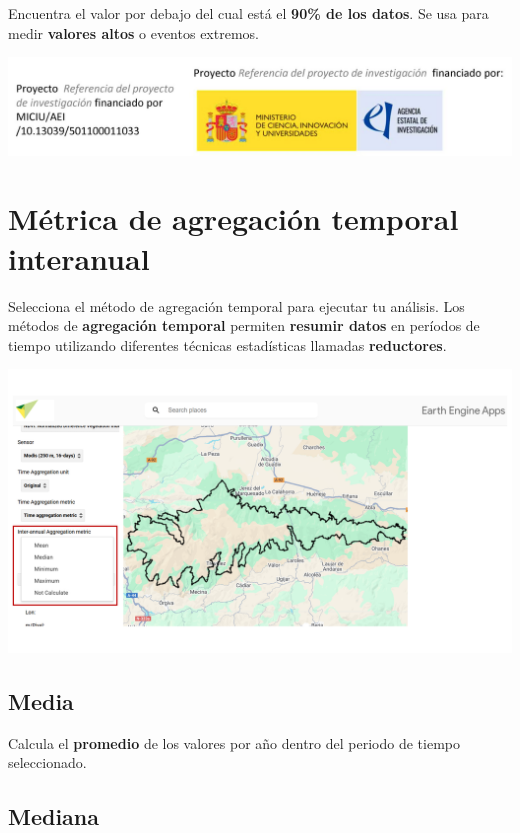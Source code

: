 \documentclass[
]{book}
\begin{document}
Encuentra el valor por debajo del cual está el \textbf{90\% de los datos}. Se usa para medir \textbf{valores altos} o eventos extremos.

\includegraphics{assets/logo.jpeg}

\chapter{Métrica de agregación temporal interanual}\label{agregacion-temporal-interanual}

Selecciona el método de agregación temporal para ejecutar tu análisis. Los métodos de \textbf{agregación temporal} permiten \textbf{resumir datos} en períodos de tiempo utilizando diferentes técnicas estadísticas llamadas \textbf{reductores}.

\includegraphics{assets/interannualAggregation.png}

\section{\texorpdfstring{\textbf{Media}}{Media}}\label{media-1}

Calcula el \textbf{promedio} de los valores por año dentro del periodo de tiempo seleccionado.

\section{\texorpdfstring{\textbf{Mediana}}{Mediana}}\label{mediana-1}
\end{document}
